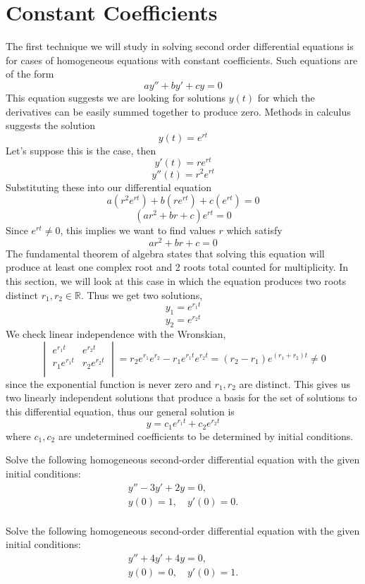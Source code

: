 \section{Constant Coefficients}
The first technique we will study in solving second order differential equations is for cases of homogeneous equations with constant coefficients. Such equations are of the form 
\[ay'' + by' + cy = 0\]
This equation suggests we are looking for solutions $y(t)$ for which the derivatives can be easily summed together to produce zero. Methods in calculus suggests the solution
\[y(t) = e^{rt}\]
Let's suppose this is the case, then
\[y'(t) = re^{rt}\]
\[y''(t) = r^2e^{rt}\]
Substituting these into our differential equation
\[a(r^2e^{rt}) + b(re^{rt}) + c(e^{rt}) = 0\]
\[(ar^2 + br + c)e^{rt} = 0\]
Since $e^{rt} \neq 0$, this implies we want to find values $r$ which satisfy 
\[ar^2 + br + c = 0\]
The fundamental theorem of algebra states that solving this equation will produce at least one complex root and 2 roots total counted for multiplicity. In this section, we will look at this case in which the equation produces two roots distinct $r_1, r_2 \in \mathbb{R}$. Thus we get two solutions, 
\[y_1 = e^{r_1t}\]
\[y_2 = e^{r_2t}\]
We check linear independence with the Wronskian,
\[\begin{vmatrix}
e^{r_1t} & e^{r_2t} \\
r_1e^{r_1t} & r_2e^{r_2t} \\
\end{vmatrix} = r_2e^{r_1}e^{r_2} - r_1e^{r_1t}e^{r_2t} = (r_2-r_1)e^{(r_1+r_2)t} \neq 0 \]
since the exponential function is never zero and $r_1, r_2$ are distinct.
This gives us two linearly independent solutions that produce a basis for the set of solutions to this differential equation, thus our general solution is
\[y = c_1e^{r_1t} + c_2e^{r_2t}\]
where $c_1, c_2$ are undetermined coefficients to be determined by initial conditions. 
\exercises
\begin{exerciselist}
\item Solve the following homogeneous second-order differential equation with the given initial conditions:
\begin{align*}
    y'' - 3y' + 2y = 0, \\
    y(0) = 1, \quad y'(0) = 0. \\
\end{align*} 
\item Solve the following homogeneous second-order differential equation with the given initial conditions:
\begin{align*}
    y'' + 4y' + 4y = 0, \\
    y(0) = 0, \quad y'(0) = 1.\\
\end{align*}
\end{exerciselist}

